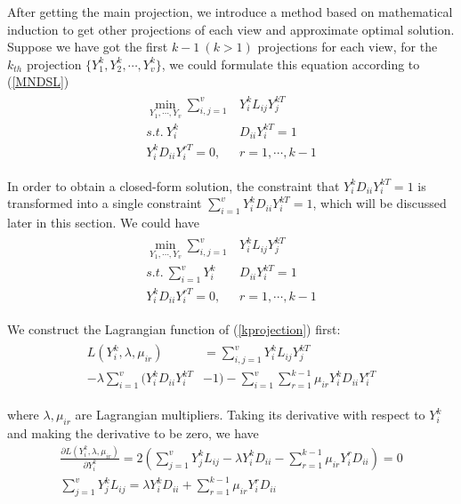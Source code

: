 \documentclass[journal]{IEEEtran}
\begin{document}
After getting the main projection, we introduce a method based on mathematical induction to get other projections of each view and approximate optimal solution. 
Suppose we have got the first $k-1\ (k>1)$ projections for each view, for the $k_{th}$ projection $\{Y_1^k, Y_2^k, \cdots, Y_v^k \}$, we could formulate this equation according to (\ref{MNDSL}) 
\begin{align}
\begin{split}
\min_{Y_1,\cdots, Y_v} \sum_{i,j=1}^v& Y_i^k L_{ij} Y_j^{kT} \\
s.t.\ Y_i^k& D_{ii} Y_i^{kT} = 1 \\
Y_i^k  D_{ii} Y_i^{rT} = 0, &r=1,\cdots, k-1
\end{split}
\label{eq16}
\end{align}

In order to obtain a closed-form solution, the constraint that $Y_i^k D_{ii} Y_i^{kT} = 1$ is transformed into a single constraint $\sum_{i=1}^v Y_i^k D_{ii} Y_i^{kT} = 1$, which will be discussed later in this section. 
We could have
\begin{align}
\begin{split}
\min_{Y_1,\cdots, Y_v} \sum_{i,j=1}^v& Y_i^k L_{ij} Y_j^{kT} \\
s.t.\ \sum_{i=1}^vY_i^k& D_{ii} Y_i^{kT} = 1 \\
Y_i^k  D_{ii} Y_i^{rT} = 0, &r=1,\cdots, k-1
\label{kprojection}
\end{split}
\end{align}

We construct the Lagrangian function of (\ref{kprojection}) first: 
\begin{align}
\begin{split}
L(Y_i^k, \lambda,\mu_{ir})&=\sum_{i,j=1}^v Y_i^k{L_{ij}}Y_j^{kT} \\
-\lambda \sum_{i=1}^v (Y_i^k{D_{ii}}Y_i^{kT}&-1) 
-\sum_{i=1}^v \sum_{r=1}^{k-1} \mu_{ir}Y_i^kD_{ii} Y_i^{rT}
\end{split}
\end{align}

where $\lambda, \mu_{ir}$ are Lagrangian multipliers. 
Taking its derivative with respect to $Y_i^k$ and making the derivative to be zero, we have
\begin{gather}
\frac{\partial L(Y_i^k, \lambda, \mu_{ir})}{\partial Y_i^k} = 2(
\sum_{j=1}^v Y_j^{k}{L_{ij}}-
\lambda Y_i^k{D_{ii}}
-\sum_{r=1}^{k-1}\mu_{ir}Y_i^r{D_{ii}})=0 \nonumber \\
\sum_{j=1}^v Y_j^{k}{L_{ij}}=
\lambda Y_i^k{D_{ii}}
+\sum_{r=1}^{k-1}\mu_{ir}Y_i^r{D_{ii}}
\label{original}
\end{gather}
\end{document}
